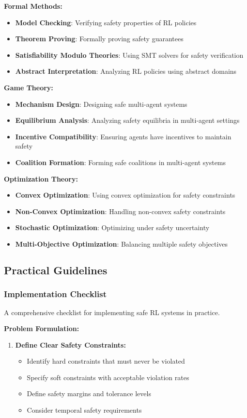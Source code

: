 \documentclass[12pt]{article}
\begin{document}
{{{{\textbf{Formal Methods:}
\begin{itemize}
\item \textbf{Model Checking}: Verifying safety properties of RL policies
\item \textbf{Theorem Proving}: Formally proving safety guarantees
\item \textbf{Satisfiability Modulo Theories}: Using SMT solvers for safety verification
\item \textbf{Abstract Interpretation}: Analyzing RL policies using abstract domains
\end{itemize}

\textbf{Game Theory:}
\begin{itemize}
\item \textbf{Mechanism Design}: Designing safe multi-agent systems
\item \textbf{Equilibrium Analysis}: Analyzing safety equilibria in multi-agent settings
\item \textbf{Incentive Compatibility}: Ensuring agents have incentives to maintain safety
\item \textbf{Coalition Formation}: Forming safe coalitions in multi-agent systems
\end{itemize}

\textbf{Optimization Theory:}
\begin{itemize}
\item \textbf{Convex Optimization}: Using convex optimization for safety constraints
\item \textbf{Non-Convex Optimization}: Handling non-convex safety constraints
\item \textbf{Stochastic Optimization}: Optimizing under safety uncertainty
\item \textbf{Multi-Objective Optimization}: Balancing multiple safety objectives
\end{itemize}

\subsection{Practical Guidelines}

\subsubsection{Implementation Checklist}

A comprehensive checklist for implementing safe RL systems in practice.

\textbf{Problem Formulation:}
\begin{enumerate}
\item \textbf{Define Clear Safety Constraints:}
   \begin{itemize}
   \item Identify hard constraints that must never be violated
   \item Specify soft constraints with acceptable violation rates
   \item Define safety margins and tolerance levels
   \item Consider temporal safety requirements
   \end{itemize}


\end{enumerate}}}}}
\end{document}
